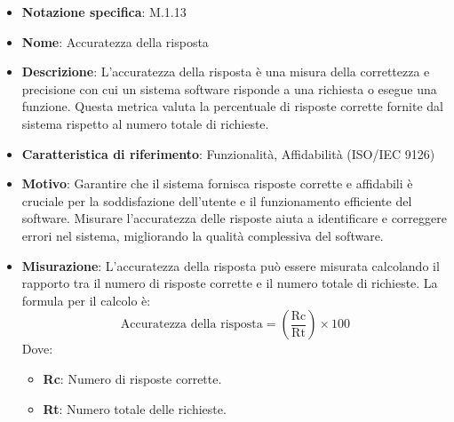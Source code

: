 \begin{itemize}
    \item \textbf{Notazione specifica}: M.1.13
    \item \textbf{Nome}: Accuratezza della risposta
    \item \textbf{Descrizione}: L'accuratezza della risposta è una misura della correttezza e precisione con cui un sistema software risponde a una richiesta o esegue una funzione. Questa metrica valuta la percentuale di risposte corrette fornite dal sistema rispetto al numero totale di richieste.
    \item \textbf{Caratteristica di riferimento}: Funzionalità, Affidabilità (ISO/IEC 9126)
    \item \textbf{Motivo}: Garantire che il sistema fornisca risposte corrette e affidabili è cruciale per la soddisfazione dell'utente e il funzionamento efficiente del software. Misurare l'accuratezza delle risposte aiuta a identificare e correggere errori nel sistema, migliorando la qualità complessiva del software.
    \item \textbf{Misurazione}: L'accuratezza della risposta può essere misurata calcolando il rapporto tra il numero di risposte corrette e il numero totale di richieste. La formula per il calcolo è:
    \begin{equation}
    \text{Accuratezza della risposta} = \left( \frac{\text{Rc}}{\text{Rt}} \right) \times 100
    \end{equation}
    Dove:
    \begin{itemize}
        \item \textbf{Rc}: Numero di risposte corrette.
        \item \textbf{Rt}: Numero totale delle richieste.
    \end{itemize}
\end{itemize}
